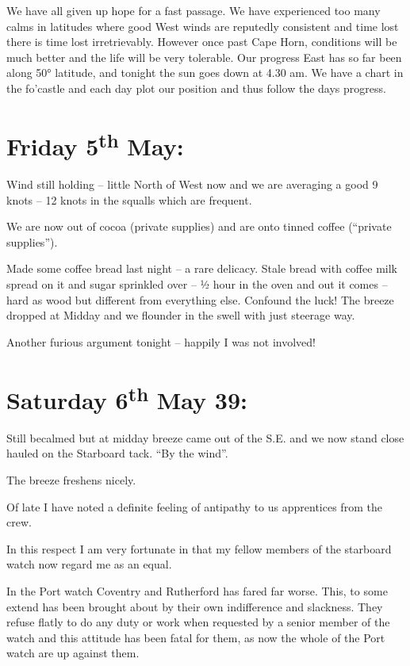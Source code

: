 \documentclass[
  11pt,
  msmallroyalvopaper
]{memoir}
\begin{document}
We have all given up hope for a fast passage. We have experienced too
many calms in latitudes where good West winds are reputedly consistent
and time lost there is time lost irretrievably. However once past Cape
Horn, conditions will be much better and the life will be very
tolerable. Our progress East has so far been along 50° latitude, and
tonight the sun goes down at 4.30 am. We have a chart in the fo'castle
and each day plot our position and thus follow the days progress.

\hypertarget{friday-5th-may}{%
\section{\texorpdfstring{Friday 5\textsuperscript{th}
May:}{Friday 5th May:}}\label{friday-5th-may}}

Wind still holding -- little North of West now and we are averaging a
good 9 knots -- 12 knots in the squalls which are frequent.

We are now out of cocoa (private supplies) and are onto tinned coffee
(``private supplies'').

Made some coffee bread last night -- a rare delicacy. Stale bread with
coffee milk spread on it and sugar sprinkled over -- ½ hour in the oven
and out it comes -- hard as wood but different from everything else.
Confound the luck! The breeze dropped at Midday and we flounder in the
swell with just steerage way.

Another furious argument tonight -- happily I was not involved!

\hypertarget{saturday-6th-may-39}{%
\section{\texorpdfstring{Saturday 6\textsuperscript{th} May
39:}{Saturday 6th May 39:}}\label{saturday-6th-may-39}}

Still becalmed but at midday breeze came out of the S.E. and we now
stand close hauled on the Starboard tack. ``By the wind''.

The breeze freshens nicely.

Of late I have noted a definite feeling of antipathy to us apprentices
from the crew.

In this respect I am very fortunate in that my fellow members of the
starboard watch now regard me as an equal.

In the Port watch Coventry and Rutherford has fared far worse. This, to
some extend has been brought about by their own indifference and
slackness. They refuse flatly to do any duty or work when requested by a
senior member of the watch and this attitude has been fatal for them, as
now the whole of the Port watch are up against them.
\end{document}
